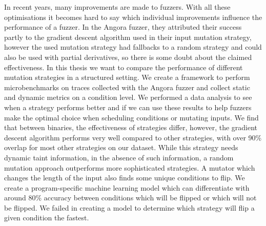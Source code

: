 


\begin{abstracts}        %
In recent years, many improvements are made to fuzzers. With all these optimisations it becomes hard to say which individual improvements influence the performance of a fuzzer. In the Angora fuzzer, they attributed their success partly to the gradient descent algorithm used in their input mutation strategy, however the used mutation strategy had fallbacks to a random strategy and could also be used with partial derivatives, so there is some doubt about the claimed effectiveness. In this thesis we want to compare the performance of different mutation strategies in a structured setting. We create a framework to perform microbenchmarks on traces collected with the Angora fuzzer and collect static and dynamic metrics on a condition level. We performed a data analysis to see when a strategy performs better and if we can use these results to help fuzzers make the optimal choice when scheduling conditions or mutating inputs.
We find that between binaries, the effectiveness of strategies differ, however, the gradient descent algorithm performs very well compared to other strategies, with over 90\% overlap for most other strategies on our dataset. While this strategy needs dynamic taint information, in the absence of such information, a random mutation approach outperforms more sophisticated strategies. A mutator which changes the length of the input also finds some unique conditions to flip. We create a program-specific machine learning model which can differentiate with around 80\% accuracy between conditions which will be flipped or which will not be flipped. We failed in creating a model to determine which strategy will flip a given condition the fastest.
\end{abstracts}



